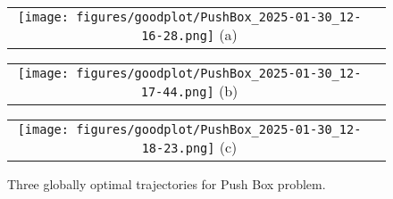
\begin{figure}[htbp]
    \centering
    \begin{minipage}{\columnwidth}
        \centering
        \begin{tabular}{cc}
            \begin{minipage}{0.5\columnwidth}
                \centering
                \texttt{[image: figures/goodplot/PushBox\_2025-01-30\_12-16-28.png]}
                (a)
            \end{minipage}
        \end{tabular}
    \end{minipage}

    \begin{minipage}{\columnwidth}
        \centering
        \begin{tabular}{cc}
            \begin{minipage}{0.5\columnwidth}
                \centering
                \texttt{[image: figures/goodplot/PushBox\_2025-01-30\_12-17-44.png]}
                (b) 
            \end{minipage}
        \end{tabular}
    \end{minipage}

    \begin{minipage}{\columnwidth}
        \centering
        \begin{tabular}{cc}
            \begin{minipage}{0.5\columnwidth}
                \centering
                \texttt{[image: figures/goodplot/PushBox\_2025-01-30\_12-18-23.png]}
                (c) 
            \end{minipage}
        \end{tabular}
    \end{minipage}

    \caption{Three globally optimal trajectories for Push Box problem. \label{fig:exp:PushBox}}
\end{figure}